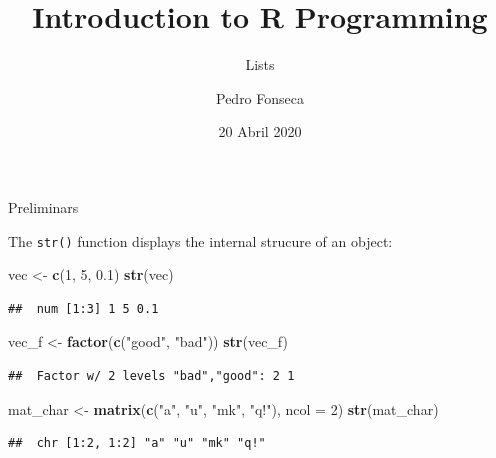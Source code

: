 \documentclass[ignorenonframetext,]{beamer}
\title{Introduction to R Programming}
\subtitle{Lists}
\author{Pedro Fonseca}
\date{20 Abril 2020}
\newenvironment{Shaded}{\begin{snugshade}}{\end{snugshade}}
\newcommand{\DataTypeTok}[1]{\textcolor[rgb]{0.13,0.29,0.53}{#1}}
\newcommand{\DecValTok}[1]{\textcolor[rgb]{0.00,0.00,0.81}{#1}}
\newcommand{\FloatTok}[1]{\textcolor[rgb]{0.00,0.00,0.81}{#1}}
\newcommand{\KeywordTok}[1]{\textcolor[rgb]{0.13,0.29,0.53}{\textbf{#1}}}
\newcommand{\NormalTok}[1]{#1}
\newcommand{\StringTok}[1]{\textcolor[rgb]{0.31,0.60,0.02}{#1}}
\begin{document}
\frame{\titlepage}

\begin{frame}[fragile]{Preliminars}
\protect\hypertarget{preliminars}{}

The \texttt{str()} function displays the internal strucure of an object:

\begin{Shaded}
\begin{Highlighting}[]
\NormalTok{vec <-}\StringTok{ }\KeywordTok{c}\NormalTok{(}\DecValTok{1}\NormalTok{, }\DecValTok{5}\NormalTok{, }\FloatTok{0.1}\NormalTok{)}
\KeywordTok{str}\NormalTok{(vec)}
\end{Highlighting}
\end{Shaded}

\begin{verbatim}
##  num [1:3] 1 5 0.1
\end{verbatim}

\begin{Shaded}
\begin{Highlighting}[]
\NormalTok{vec_f <-}\StringTok{ }\KeywordTok{factor}\NormalTok{(}\KeywordTok{c}\NormalTok{(}\StringTok{"good"}\NormalTok{, }\StringTok{"bad"}\NormalTok{))}
\KeywordTok{str}\NormalTok{(vec_f)}
\end{Highlighting}
\end{Shaded}

\begin{verbatim}
##  Factor w/ 2 levels "bad","good": 2 1
\end{verbatim}

\begin{Shaded}
\begin{Highlighting}[]
\NormalTok{mat_char <-}\StringTok{ }\KeywordTok{matrix}\NormalTok{(}\KeywordTok{c}\NormalTok{(}\StringTok{"a"}\NormalTok{, }\StringTok{"u"}\NormalTok{, }\StringTok{"mk"}\NormalTok{, }\StringTok{"q!"}\NormalTok{), }\DataTypeTok{ncol =} \DecValTok{2}\NormalTok{)}
\KeywordTok{str}\NormalTok{(mat_char)}
\end{Highlighting}
\end{Shaded}

\begin{verbatim}
##  chr [1:2, 1:2] "a" "u" "mk" "q!"
\end{verbatim}

\end{frame}
\end{document}
